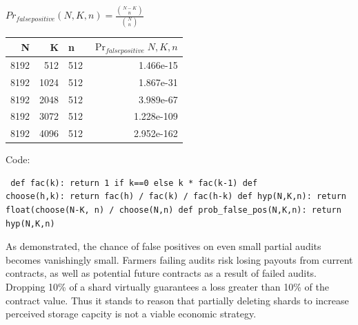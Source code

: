 \documentclass[a4paper,10pt]{article} \usepackage[utf8]{inputenc}
\begin{document}
{\centering $Pr_{false positive}(N,K,n) = \displaystyle \frac{{N-K \choose n}}
{{N \choose n}}$ \\}

\begin{table}[hbt!] \begin{center} \begin{tabular}{r r l r} N & K & n &
$\Pr_{falsepositive}{N,K,n}$\\ \hline 8192 & 512  & 512 & 1.466e-15\\ \hline
8192 & 1024 & 512 & 1.867e-31\\ \hline 8192 & 2048 & 512 & 3.989e-67\\ \hline
8192 & 3072 & 512 & 1.228e-109\\ \hline 8192 & 4096 & 512 & 2.952e-162\\
\end{tabular} \end{center} \end{table}

Code: \begin{lstlisting} def fac(k): return 1 if k==0 else k * fac(k-1) def
choose(h,k): return fac(h) / fac(k) / fac(h-k) def hyp(N,K,n): return
float(choose(N-K, n) / choose(N,n) def prob_false_pos(N,K,n): return hyp(N,K,n)
\end{lstlisting}

As demonstrated, the chance of false positives on even small partial audits
becomes vanishingly small. Farmers failing audits risk losing payouts from
current contracts, as well as potential future contracts as a result of failed
audits. Dropping 10\% of a shard virtually guarantees a loss greater than 10\%
of the contract value. Thus it stands to reason that partially deleting shards
to increase perceived storage capcity is not a viable economic strategy.













\newpage  \begingroup \raggedright
 \endgroup
\end{document}

